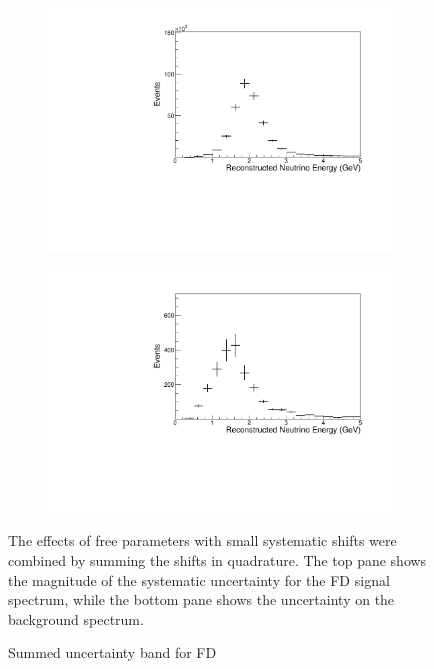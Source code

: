 {\begin{figure}
\end{figure}


\begin{figure}
\begin{center}
\begin{subfigure}[c]{0.7\textwidth}
\includegraphics[width=\textwidth]{figures/systs/params/fd_sig_genie_sum_errors.pdf}
\end{subfigure}

\begin{subfigure}[c]{0.7\textwidth}
\includegraphics[width=\textwidth]{figures/systs/params/fd_bkg_genie_sum_errors.pdf}
\end{subfigure}
\end{center}
\caption{Summed \genie uncertainty band for FD}{
The effects of free parameters with small systematic shifts were
combined by summing the shifts in quadrature.
The top pane shows the magnitude of the systematic uncertainty for the FD
signal spectrum, while the bottom pane shows the uncertainty on the
background spectrum.
}
\label{syst_param_sum_small_genie_fd}


\end{figure}}
